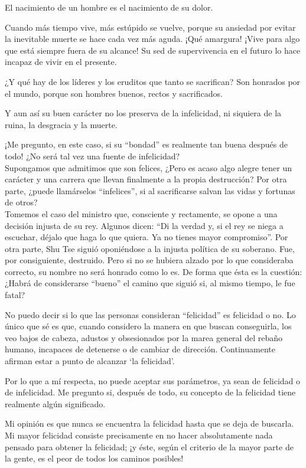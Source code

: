 \documentclass[book,b5paper,hidelinks,final]{memoir}
\begin{document}
	El nacimiento de un hombre es el nacimiento de su dolor.
	
	Cuando más tiempo vive, más estúpido se vuelve, porque su ansiedad por
	evitar la inevitable muerte se hace cada vez más aguda. ¡Qué amargura!
	¡Vive para algo que está siempre fuera de su alcance! Su sed de
	supervivencia en el futuro lo hace incapaz de vivir en el presente.
	
	¿Y qué hay de los líderes y los eruditos que tanto se sacrifican? Son
	honrados por el mundo, porque son hombres buenos, rectos y sacrificados.
	
	Y aun así su buen carácter no los preserva de la infelicidad, ni
	siquiera de la ruina, la desgracia y la muerte.
	
	¡Me pregunto, en este caso, si su ``bondad'' es realmente tan buena
	después de todo! ¿No será tal vez una fuente de infelicidad?\\
	Supongamos que admitimos que son felices, ¿Pero es acaso algo alegre
	tener un carácter y una carrera que llevan finalmente a la propia
	destrucción? Por otra parte, ¿puede llamárselos ``infelices'', si al
	sacrificarse salvan las vidas y fortunas de otros?\\
	Tomemos el caso del ministro que, consciente y rectamente, se opone a
	una decisión injusta de su rey. Algunos dicen: ``Di la verdad y, si el
	rey se niega a escuchar, déjalo que haga lo que quiera. Ya no tienes
	mayor compromiso''. Por otra parte, Shu Tse siguió oponiéndose a la
	injusta política de su soberano. Fue, por consiguiente, destruido. Pero
	si no se hubiera alzado por lo que consideraba correcto, su nombre no
	será honrado como lo es. De forma que ésta es la cuestión: ¿Habrá de
	considerarse ``bueno'' el camino que siguió si, al mismo tiempo, le fue
	fatal?
	
	No puedo decir si lo que las personas consideran ``felicidad'' es
	felicidad o no. Lo único que sé es que, cuando considero la manera en
	que buscan conseguirla, los veo bajos de cabeza, adustos y obsesionados
	por la marea general del rebaño humano, incapaces de detenerse o de
	cambiar de dirección. Continuamente afirman estar a punto de alcanzar
	`la felicidad'.
	
	Por lo que a mí respecta, no puede aceptar sus parámetros, ya sean de
	felicidad o de infelicidad. Me pregunto si, después de todo, su concepto
	de la felicidad tiene realmente algún significado.
	
	Mi opinión es que nunca se encuentra la felicidad hasta que se deja de
	buscarla. Mi mayor felicidad consiste precisamente en no hacer
	absolutamente nada pensado para obtener la felicidad; ¡y éste, según el
	criterio de la mayor parte de la gente, es el peor de todos los caminos
	posibles!
	
\end{document}
